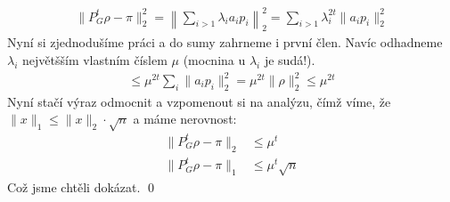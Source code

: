 \begin{align}
	\|P_G^t\rho - \pi\|_2^2 = \left\|\sum_{i > 1} \lambda_ia_ip_i\right\|_2^2 = \sum_{i>1}\lambda_i^{2t}\|a_ip_i\|_2^2
\end{align}
Nyní si zjednodušíme práci a do sumy zahrneme i první člen. Navíc odhadneme $\lambda_i$ největšším vlastním číslem $\mu$ (mocnina u $\lambda_i$ je sudá!).
\begin{align}
	\leq \mu^{2t}\sum_i\|a_ip_i\|_2^2 = \mu^{2t}\|\rho\|_2^2 \leq \mu^{2t}
\end{align}
Nyní stačí výraz odmocnit a vzpomenout si na analýzu, čímž víme, že $\|x\|_1 \leq \|x\|_2 \cdot \sqrt n$ a máme nerovnost:
\begin{align}
	\|P_G^t\rho - \pi\|_2 &\leq \mu^{t} \\
	\|P_G^t\rho - \pi\|_1 &\leq \mu^{t} \sqrt n
\end{align}
Což jsme chtěli dokázat. \qed


